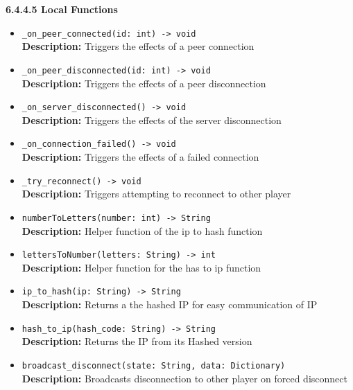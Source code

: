\documentclass[12pt, titlepage]{article}
\begin{document}
\textbf{6.4.4.5 Local Functions}
\begin{itemize}
    \item \texttt{\_on\_peer\_connected(id: int) -> void}\\
    \textbf{Description:} Triggers the effects of a peer connection
    
    \item \texttt{\_on\_peer\_disconnected(id: int) -> void}\\
    \textbf{Description:} Triggers the effects of a peer disconnection
    
    \item \texttt{\_on\_server\_disconnected() -> void}\\
    \textbf{Description:} Triggers the effects of the server disconnection
    
    \item \texttt{\_on\_connection\_failed() -> void}\\
    \textbf{Description:} Triggers the effects of a failed connection
    
    \item \texttt{\_try\_reconnect() -> void}\\
    \textbf{Description:} Triggers attempting to reconnect to other player
    
    \item \texttt{numberToLetters(number: int) -> String}\\
    \textbf{Description:} Helper function of the ip to hash function
    
    \item \texttt{lettersToNumber(letters: String) -> int}\\
    \textbf{Description:} Helper function for the has to ip function
    
    \item \texttt{ip\_to\_hash(ip: String) -> String}\\
    \textbf{Description:} Returns a the hashed IP for easy communication of IP
    
    \item \texttt{hash\_to\_ip(hash\_code: String) -> String}\\
    \textbf{Description:} Returns the IP from its Hashed version
    
    \item \texttt{broadcast\_disconnect(state: String, data: Dictionary)}\\
    \textbf{Description:} Broadcasts disconnection to other player on forced disconnect
    

\end{itemize}
\end{document}
